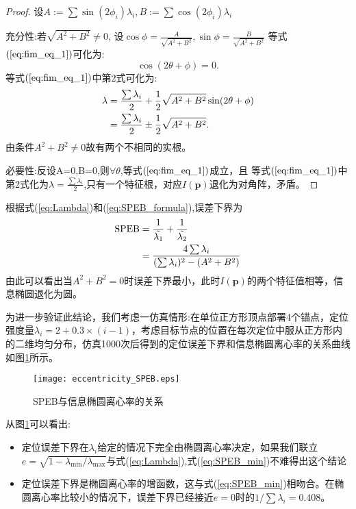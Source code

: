 \begin{proof}
设$A:=\sum\sin(2\phi_i)\lambda_i,B:=\sum\cos(2\phi_i)\lambda_i$

充分性:若$\sqrt{A^2+B^2} \neq 0$,
设$\cos\phi=\frac{A}{\sqrt{A^2+B^2}},\sin\phi=\frac{B}{\sqrt{A^2+B^2}}$
等式$(\ref{eq:fim_eq_1})$可化为:
\begin{equation}
\cos(2\theta+\phi)=0.
\end{equation}
等式$(\ref{eq:fim_eq_1})$中第2式可化为:
\begin{align}\notag\label{eq:Lambda}
\lambda&=\frac{\sum \lambda_i}{2}+\frac{1}{2}\sqrt{A^2+B^2}\sin(2\theta+\phi)\\
&=\frac{\sum \lambda_i}{2}\pm\frac{1}{2}\sqrt{A^2+B^2}.
\end{align}
由条件$A^2+B^2\neq 0$故有两个不相同的实根。

必要性:反设A=0,B=0,则$\forall \theta$,等式$(\ref{eq:fim_eq_1})$成立，且
等式$(\ref{eq:fim_eq_1})$中第2式化为$\lambda=\frac{\sum \lambda_i}{2}$,只有一个特征根，对应$I(\bm{p})$退化为对角阵，矛盾。
\end{proof}
\begin{remark}

根据式(\ref{eq:Lambda})和(\ref{eq:SPEB_formula}),误差下界为
\begin{align}\notag\label{eq:SPEB_min}
\text{SPEB}&=\frac{1} {\tilde{\lambda_1}}+\frac{1}{\tilde{\lambda_2}}\\
&=\frac{4\sum \lambda_i}{(\sum \lambda_i)^2-(A^2+B^2)}
\end{align}
由此可以看出当$A^2+B^2=0$时误差下界最小，此时$I(\bm{p})$的两个特征值相等，信息椭圆退化为圆。

为进一步验证此结论，我们考虑一仿真情形:在单位正方形顶点部署4个锚点，定位强度量$\lambda_i=2+0.3\times(i-1)$，考虑目标节点的位置在每次定位中服从正方形内的二维均匀分布，仿真1000次后得到的定位误差下界和信息椭圆离心率的关系曲线如图\ref{fig:eccentricity}所示。
\begin{figure}
  \centering
  \texttt{[image: eccentricity\_SPEB.eps]}
  \caption{SPEB与信息椭圆离心率的关系}\label{fig:eccentricity}
\end{figure}
从图\ref{fig:eccentricity}可以看出:
\begin{itemize}
  \item 定位误差下界在$\lambda_i$给定的情况下完全由椭圆离心率决定，如果我们联立$e=\sqrt{1-\lambda_{\min}/\lambda_{\max}}$与式(\ref{eq:Lambda}),式(\ref{eq:SPEB_min})不难得出这个结论
  \item 定位误差下界是椭圆离心率的增函数，这与式(\ref{eq:SPEB_min})相吻合。在椭圆离心率比较小的情况下，误差下界已经接近$e=0$时的$1/\sum \lambda_i=0.408$。
\end{itemize}
\end{remark}
